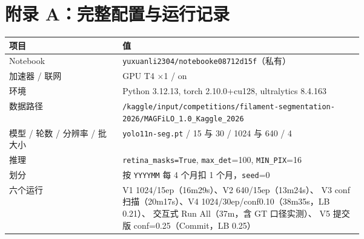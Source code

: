 \documentclass{article}
\begin{document}
\section{附录 A：完整配置与运行记录}
\begin{table}[h]
\centering
\footnotesize
\setlength{\tabcolsep}{3pt}
\begin{tabular}{@{}l p{0.68\linewidth}@{}}
\toprule
项目 & 值 \\
\midrule
Notebook & \texttt{yuxuanli2304/notebooke08712d15f}（私有） \\
加速器 / 联网 & GPU T4 $\times$1 / on \\
环境 & Python 3.12.13, torch 2.10.0+cu128, ultralytics 8.4.163 \\
数据路径 & \texttt{/kaggle/input/\allowbreak competitions/\allowbreak filament-segmentation-2026/\allowbreak MAGFiLO\_1.0\_Kaggle\_2026} \\
模型 / 轮数 / 分辨率 / 批大小 & \texttt{yolo11n-seg.pt} / 15 与 30 / 1024 与 640 / 4 \\
推理 & \texttt{retina\_masks=True}, \texttt{max\_det}=100, \texttt{MIN\_PIX}=16 \\
划分 & 按 \texttt{YYYYMM} 每 4 个月扣 1 个月，\texttt{seed}=0 \\
六个运行 & V1 1024/15ep（16m29s）、V2 640/15ep（13m24s）、
  V3 conf 扫描（20m17s）、V4 1024/30ep/conf0.10（38m35s，LB 0.21）、
  交互式 Run All（37m，含 GT 口径实测）、
  V5 提交版 conf=0.25（Commit，LB 0.25） \\
\bottomrule
\end{tabular}
\end{table}
\end{document}
